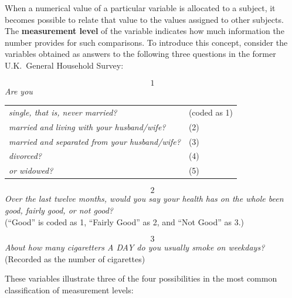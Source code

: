 \documentclass[11pt,a4paper,openany]{book}
\begin{document}
When a numerical value of a particular variable is allocated to a
subject, it becomes possible to relate that value to the values assigned
to other subjects. The \textbf{measurement level} of the variable
indicates how much information the number provides for such comparisons.
To introduce this concept, consider the variables obtained as answers to
the following three questions in the former U.K.~General Household
Survey:

\[1\] \emph{Are you}

\begin{longtable}[]{@{}ll@{}}
\toprule
\emph{single, that is, never married?} & (coded as 1)\tabularnewline
\emph{married and living with your husband/wife?} & (2)\tabularnewline
\emph{married and separated from your husband/wife?} &
(3)\tabularnewline
\emph{divorced?} & (4)\tabularnewline
\emph{or widowed?} & (5)\tabularnewline
\bottomrule
\end{longtable}

\[2\] \emph{Over the last twelve months, would you say your health has
on the whole been good, fairly good, or not good?}\\
(``Good'' is coded as 1, ``Fairly Good'' as 2, and ``Not Good'' as 3.)

\[3\] \emph{About how many cigaretters A DAY do you usually smoke on
weekdays?}\\
(Recorded as the number of cigarettes)

These variables illustrate three of the four possibilities in the most
common classification of measurement levels:
\end{document}
